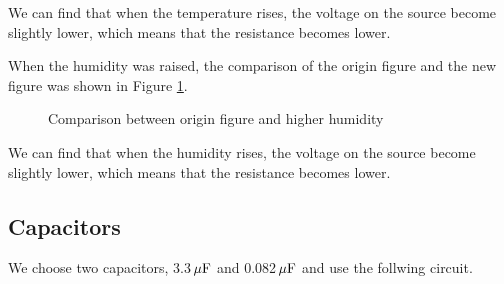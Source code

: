 \documentclass{article}
\newcommand{\unit}[1]{{\rm\,#1}}
\begin{document}
We can find that when the temperature rises, the voltage on the source become slightly lower, which means that the resistance becomes lower.

\newpage
When the humidity was raised, the comparison of the origin figure and the new figure was shown in Figure \ref{fig-1-3}.

\begin{figure}[htbp]
	\centering
	\caption{Comparison between origin figure and higher humidity}
	\label{fig-1-3}
\end{figure}

We can find that when the humidity rises, the voltage on the source become slightly lower, which means that the resistance becomes lower.

\newpage

\subsection{Capacitors}

We choose two capacitors, 3.3$\unit{\mu F}$ and 0.082$\unit{\mu F}$ and use the follwing circuit.

\begin{center}
\end{center}
\end{document}
